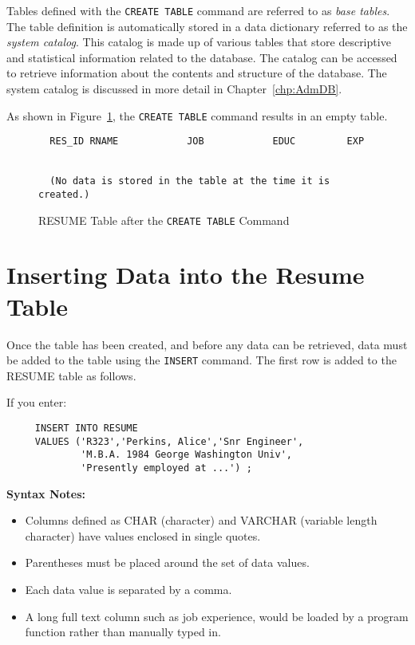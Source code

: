 Tables defined with the {\tt CREATE TABLE} command are referred to as {\em
base tables}.  The table definition is automatically stored in a data
dictionary referred to as the {\em system catalog}.  This catalog is
made up of various tables that store descriptive and statistical
information related to the database.  The catalog can be accessed to
retrieve information about the contents and structure of the database.
The system catalog is discussed in more detail in
Chapter~\ref{chp:AdmDB}.

As shown in Figure~\ref{fig:CrTab}, the {\tt CREATE TABLE} command results
in an empty table.

\begin{figure}
\caption{RESUME Table after the {\tt CREATE TABLE} Command}{\label{fig:CrTab}}
\begin{screen}
\begin{verbatim}
  RES_ID RNAME            JOB            EDUC         EXP


  (No data is stored in the table at the time it is created.)
\end{verbatim}
\end{screen}
\end{figure}

\section{Inserting Data into the Resume Table}

Once the table has been created, and before any data can be retrieved,
data must be added to the table using the \verb`INSERT` command.  The first
row is added to the RESUME table as follows.

If you enter:
\begin{verbatim}
     INSERT INTO RESUME
     VALUES ('R323','Perkins, Alice','Snr Engineer',
             'M.B.A. 1984 George Washington Univ',
             'Presently employed at ...') ;
\end{verbatim}

{\bf Syntax Notes:}
\begin{itemize}
\item Columns defined as CHAR (character) and VARCHAR (variable length
character) have values enclosed in single quotes.

\item Parentheses must be placed around the set of data values.

\item Each data value is separated by a comma.

\item A long full text column such as job experience, would be loaded
by a program function rather than manually typed in.
\end{itemize}

